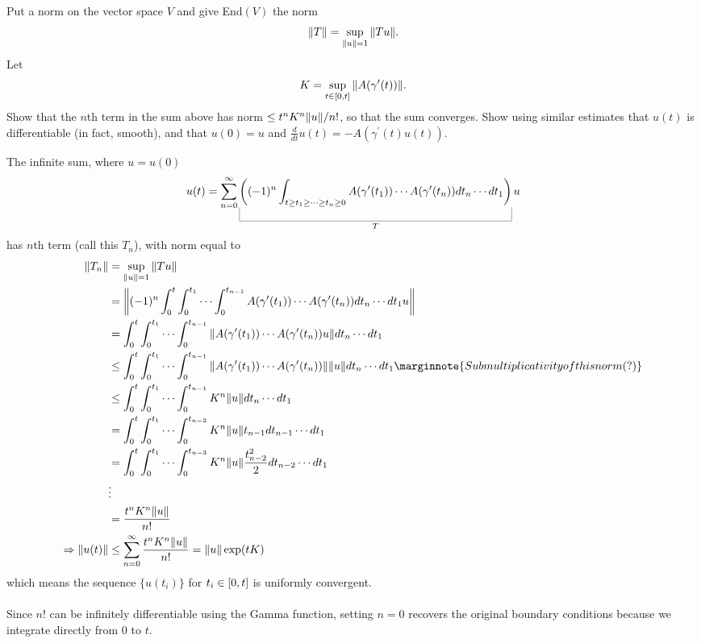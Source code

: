 \documentclass[10pt]{article}
\begin{document}
\begin{example}
	Put a norm on the vector space $V$ and give End$(V)$ the norm
	$$
	\norm{T} = \sup_{\norm{u}=1}\norm{Tu}.
	$$
	Let
	$$
	K=\sup_{t\in[0,t]}\norm{A(\gamma^\prime(t))}.
	$$
	Show that the $n$th term in the sum above has norm $\le t^nK^n\norm{u}/n!$, so that the sum converges. Show using similar estimates that $u(t)$ is differentiable (in fact, smooth), and that $u(0)=u$ and $\frac{d}{dt}u(t)=-A(\gamma^\prime(t)u(t))$.
\end{example}
\sol The infinite sum, where $u=u(0)$
$$
u(t)=\sum_{n=0}^{\infty}\ub{\p*{(-1)^n\int_{t\ge t_1\ge \cdots \ge t_n\ge 0}A(\gamma^\prime(t_1))\cdots A(\gamma^\prime(t_n))dt_n\cdots dt_1}}{T}u
$$
has $n$th term (call this $T_n$), with norm equal to
$$
\begin{aligned}
	\norm{T_n} &= \sup_{\norm{u}=1}\norm{Tu}\\
	&= \norm{(-1)^n\int_{0}^{t}\int_{0}^{t_1}\cdots\int_{0}^{t_{n-1}}A(\gamma^\prime(t_1))\cdots A(\gamma^\prime(t_n))dt_n\cdots dt_1 u}\\
	&= \int_{0}^{t}\int_{0}^{t_1}\cdots\int_{0}^{t_{n-1}}\norm{A(\gamma^\prime(t_1))\cdots A(\gamma^\prime(t_n)) u} dt_n\cdots dt_1 \\
	&\le \int_{0}^{t}\int_{0}^{t_1}\cdots\int_{0}^{t_{n-1}}\norm{A(\gamma^\prime(t_1))\cdots A(\gamma^\prime(t_n))}\norm{u}dt_n\cdots dt_1 \marginnote{Submultiplicativity of this norm (?)}\\
	&\le \int_{0}^{t}\int_{0}^{t_1}\cdots\int_{0}^{t_{n-1}} K^n \norm{u} dt_n\cdots dt_1\\
	&= \int_{0}^{t}\int_{0}^{t_1}\cdots\int_{0}^{t_{n-2}} K^n \norm{u} t_{n-1}dt_{n-1}\cdots dt_1\\
	&= \int_{0}^{t}\int_{0}^{t_1}\cdots\int_{0}^{t_{n-3}} K^n \norm{u} \frac{t_{n-2}^2}{2}dt_{n-2}\cdots dt_1\\
	&\vdots\\
	&= \frac{t^nK^n\norm{u}}{n!}\\
	\Rightarrow \norm{u(t)} &\le \sum_{n=0}^{\infty} \frac{t^nK^n\norm{u}}{n!} = \norm{u}\exp(tK)
\end{aligned}
$$
which means the sequence $\{u(t_i)\}$ for $t_i \in [0,t]$ is uniformly convergent.\\\\
Since $n!$ can be infinitely differentiable using the Gamma function, setting $n=0$ recovers the original boundary conditions because we integrate directly from 0 to $t$.
\end{document}
